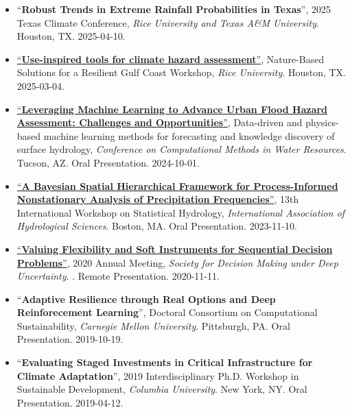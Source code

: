 \documentclass[10pt,oneside]{article}
\begin{document}
\mbox{}\vspace{-\dimexpr\baselineskip\relax}

\begin{itemize}[label={}]
  
  \item \enquote{\textbf{Robust Trends in Extreme Rainfall Probabilities in Texas}}, 2025 Texas Climate Conference,  \textit{Rice University and Texas A\&M University}. Houston, TX. 2025-04-10.
  
  \item \href{https://events.rice.edu/event/nbs-workshop#!view/all}{\enquote{\textbf{Use-inspired tools for climate hazard assessment}}}, Nature-Based Solutions for a Resilient Gulf Coast Workshop,  \textit{Rice University}. Houston, TX. 2025-03-04.
  
  \item \href{https://cmwrconference.org/wp-content/uploads/2024/09/CMWR-2024-Agenda-Full.pdf}{\enquote{\textbf{Leveraging Machine Learning to Advance Urban Flood Hazard Assessment: Challenges and Opportunities}}}, Data-driven and physics-based machine learning methods for forecasting and knowledge discovery of surface hydrology,  \textit{Conference on Computational Methods in Water Resources}. Tucson, AZ. Oral Presentation. 2024-10-01.
  
  \item \href{https://iahs.info/uploads/Commissions/ICSH/STAHY%202023%20Program%20Public.pdf}{\enquote{\textbf{A Bayesian Spatial Hierarchical Framework for Process-Informed Nonstationary Analysis of Precipitation Frequencies}}}, 13th International Workshop on Statistical Hydrology,  \textit{International Association of Hydrological Sciences}. Boston, MA. Oral Presentation. 2023-11-10.
  
  \item \href{https://2020.deepuncertainty.org/program}{\enquote{\textbf{Valuing Flexibility and Soft Instruments for Sequential Decision Problems}}}, 2020 Annual Meeting,  \textit{Society for Decision Making under Deep Uncertainty}. . Remote Presentation. 2020-11-11.
  
  \item \enquote{\textbf{Adaptive Resilience through Real Options and Deep Reinforecement Learning}}, Doctoral Consortium on Computational Sustainability,  \textit{Carnegie Mellon University}. Pittsburgh,  PA. Oral Presentation. 2019-10-19.
  
  \item \enquote{\textbf{Evaluating Staged Investments in Critical Infrastructure for Climate Adaptation}}, 2019 Interdisciplinary Ph.D. Workshop in Sustainable Development,  \textit{Columbia University}. New York, NY. Oral Presentation. 2019-04-12.
  

\end{itemize}
\end{document}
